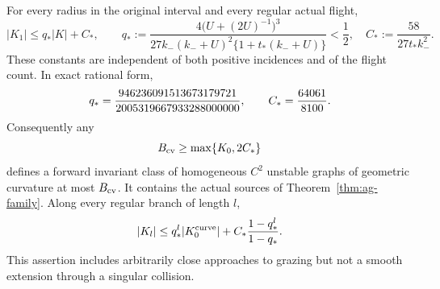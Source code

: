 \begin{theorem}
\label{thm:uc-curvature}
For every radius in the original interval and every regular actual flight,
\begin{equation}\label{eq:uc-affine}
 |K_1|\le q_*|K|+C_*,\qquad
 q_*:=\frac{4\bigl(U+(2U)^{-1}\bigr)^3}
 {27k_-(k_-+U)^2\{1+t_*(k_-+U)\}}<\frac12,
 \quad C_*:=\frac{58}{27t_*k_-^2}.
\end{equation}
These constants are independent of both positive incidences and of the
flight count. In exact rational form,
\[
 q_*={946236091513673179721\over2005319667933288000000},
 \qquad C_*={64061\over8100}.
\]
Consequently any
\begin{equation}\label{eq:uc-B}
       B_{\rm cv}\ge\max\{K_0,2C_*\}
\end{equation}
defines a forward invariant class of homogeneous $C^2$ unstable graphs
of geometric curvature at most $B_{\rm cv}$. It contains the actual sources of
Theorem~\ref{thm:ag-family}. Along every regular branch of length $l$,
\begin{equation}\label{eq:uc-iterate}
 |K_l|\le q_*^l|K_0^{\rm curve}|+
              C_*\frac{1-q_*^l}{1-q_*}.
\end{equation}
This assertion includes arbitrarily close approaches to grazing but not a
smooth extension through a singular collision.
\end{theorem}

